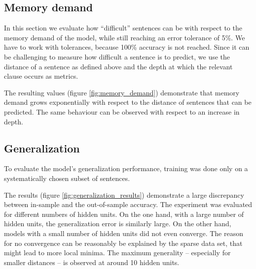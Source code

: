 \documentclass[11pt,a4paper]{article}
\newlength\figureheight
\newlength\figurewidth
\begin{document}
\subsection{Memory demand}
\label{subsec:memory_demand}

In this section we evaluate how ``difficult'' sentences can be with respect to the memory demand of the model, while still reaching an error tolerance of 5\%. We have to work with tolerances, because 100\% accuracy is not reached. Since it can be challenging to measure how difficult a sentence is to predict, we use the distance of a sentence as defined above and the depth at which the relevant clause occurs as metrics.

\setlength\figureheight{5cm}
\setlength{}
\begin{figure*}[ht]
    \qquad
    
    \caption{Distances that can be predicted with a given number of hidden units and 5\% error tolerance. The dashed line is a logarithmic approximation.}%
    \label{fig:memory_demand}%
\end{figure*}

The resulting values (figure \ref{fig:memory_demand}) demonstrate that memory demand grows exponentially with respect to the distance of sentences that can be predicted. The same behaviour can be observed with respect to an increase in depth. 

\subsection{Generalization}
\label{subsec:generalization}

To evaluate the model's generalization performance, training was done only on a systematically chosen subset of sentences.

The results (figure \ref{fig:generalization_results}) demonstrate a large discrepancy between in-sample and the out-of-sample accuracy. The experiment was evaluated for different numbers of hidden units. On the one hand, with a large number of hidden units, the generalization error is similarly large. %
On the other hand, models with a small number of hidden units did not even converge. The reason for no convergence can be reasonably be explained by the sparse data set, that might lead to more local minima. The maximum generality -- especially for smaller distances -- is observed at around 10 hidden units.
\end{document}
